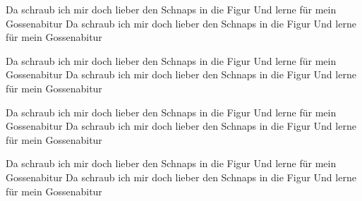     \beginchorus\replay[chorus]
        Da schraub ich mir doch lieber den Schnaps in die Figur
        Und lerne für mein Gossenabitur
        Da schraub ich mir doch lieber den Schnaps in die Figur
        Und lerne für mein Gossenabitur
    \endchorus

    \beginchorus\replay[chorus]
        Da schraub ich mir doch lieber den Schnaps in die Figur
        Und lerne für mein Gossenabitur
        Da schraub ich mir doch lieber den Schnaps in die Figur
        Und lerne für mein Gossenabitur
    \endchorus

    \beginchorus\replay[chorus]
        Da schraub ich mir doch lieber den Schnaps in die Figur
        Und lerne für mein Gossenabitur
        Da schraub ich mir doch lieber den Schnaps in die Figur
        Und lerne für mein Gossenabitur
    \endchorus

    \beginchorus\replay[chorus]
        Da schraub ich mir doch lieber den Schnaps in die Figur
        Und lerne für mein Gossenabitur
        Da schraub ich mir doch lieber den Schnaps in die Figur
        Und lerne für mein Gossenabitur
    \endchorus
\endsong
